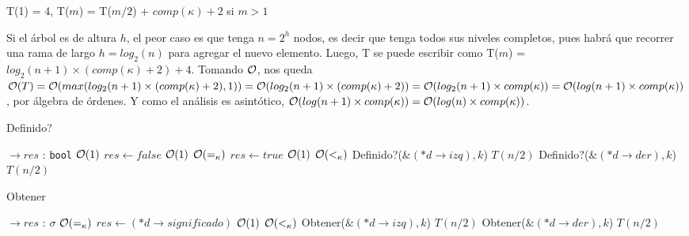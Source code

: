 \begin{Algoritmos}
\begin{algorithm}
T(1) = 4, T($m$) = T($m/2$) + $comp(\kappa) + 2$ si $m > 1$

Si el árbol es de altura $h$, el peor caso es que tenga $n = 2^{h}$ nodos, es decir que tenga todos sus niveles completos, pues habrá que recorrer una rama de largo $h = log_2(n)$ para agregar el nuevo elemento. Luego, T se puede escribir como T($m$) = $log_2(n + 1) \times (comp(\kappa) + 2) + 4$. Tomando $\mathcal{O}$, nos queda $\mathcal{O}(T) = \mathcal{O}(max(log_2(n + 1) \times (comp(\kappa) + 2), 1)) = \mathcal{O}(log_2(n + 1) \times (comp(\kappa) + 2)) = \mathcal{O}(log_2(n + 1) \times comp(\kappa)) = \mathcal{O}(log(n + 1) \times comp(\kappa))$, por álgebra de órdenes. Y como el análisis es asintótico, $\mathcal{O}(log(n + 1) \times comp(\kappa)) = \mathcal{O}(log(n) \times comp(\kappa))$.

\end{algorithm}

\begin{algorithm}
\caption{Definido?}
\begin{algorithmic}[1]
$\to res$ : \texttt{bool}
	\Comment $\mathcal{O}(1)$
	 \State $res\gets false$
	 \Comment $\mathcal{O}(1)$
	 \Else	
		\Comment $\mathcal{O}(=_{\kappa})$
			\State $res\gets true$
			\Comment $\mathcal{O}(1)$
		\Else
			\Comment $\mathcal{O}(<_{\kappa})$
				\State Definido?($\&(*d\to izq), k$)	
				\Comment $T(n/2)$	
			\Else
				\State Definido?($\&(*d\to der), k$)
				\Comment $T(n/2)$
			\EndIf
		\EndIf
	\EndIf
\EndProcedure
\end{algorithmic}
\end{algorithm}

\begin{algorithm}
\caption{Obtener}
\begin{algorithmic}[1]
$\to res$ : \texttt{$\sigma$}	
	\Comment $\mathcal{O}(=_{\kappa})$
		\State $res\gets (*d\to significado)$
		\Comment $\mathcal{O}(1)$
	\Else
		\Comment $\mathcal{O}(<_{\kappa})$
			\State Obtener($\&(*d\to izq), k$)	
			\Comment $T(n/2)$	
		\Else
			\State Obtener($\&(*d\to der), k$)
			\Comment $T(n/2)$
		\EndIf
	\EndIf

\EndProcedure
\end{algorithmic}
\end{algorithm}


\end{Algoritmos}
